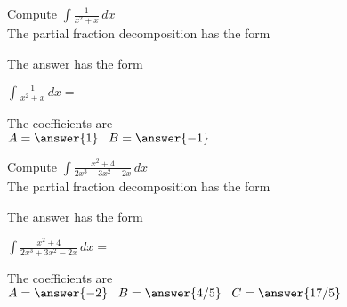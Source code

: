 \documentclass{ximera}
\begin{document}
\begin{problem}

Compute $\displaystyle{\int \frac{1}{x^2 + x}\, dx}$\\

The partial fraction decomposition has the form

\begin{multipleChoice}
\end{multipleChoice}



The answer has the form

$\displaystyle{\int \frac{1}{x^2 + x} \, dx =}$
\begin{multipleChoice}
\end{multipleChoice}

The coefficients are\\
$A = \answer{1} \;\;\; B = \answer{-1} \;\;\; $
\end{problem}



\begin{problem}

Compute $\displaystyle{\int \frac{x^2 + 4}{2x^3 + 3x^2 - 2x}\, dx}$\\

The partial fraction decomposition has the form

\begin{multipleChoice}
\end{multipleChoice}



The answer has the form

$\displaystyle{\int \frac{x^2 + 4}{2x^3 + 3x^2 - 2x}\, dx =}$
\begin{multipleChoice}
\end{multipleChoice}

The coefficients are\\
$A = \answer{-2} \;\;\; B = \answer{4/5} \;\;\; C = \answer{17/5} $
\end{problem}
\end{document}
